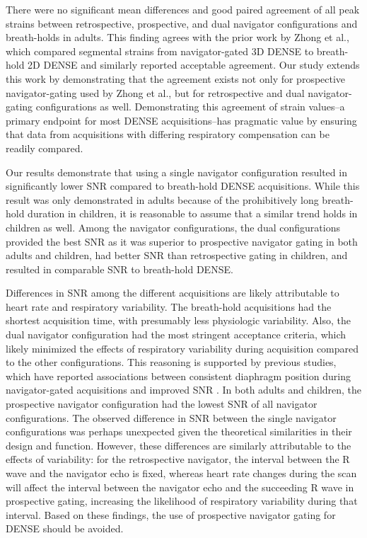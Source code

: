 	There were no significant mean differences and good paired agreement of all peak strains between retrospective, prospective, and dual navigator configurations and breath-holds in adults. This finding agrees with the prior work by Zhong et al., which compared segmental strains from navigator-gated 3D DENSE to breath-hold 2D DENSE \cite{Zhong2010a} and similarly reported acceptable agreement. Our study extends this work by demonstrating that the agreement exists not only for prospective navigator-gating used by Zhong et al., but for retrospective and dual navigator-gating configurations as well. Demonstrating this agreement of strain values--a primary endpoint for most DENSE acquisitions--has pragmatic value by ensuring that data from acquisitions with differing respiratory compensation can be readily compared.
	
	Our results demonstrate that using a single navigator configuration resulted in significantly lower SNR compared to breath-hold DENSE acquisitions. While this result was only demonstrated in adults because of the prohibitively long breath-hold duration in children, it is reasonable to assume that a similar trend holds in children as well. Among the navigator configurations, the dual configurations provided the best SNR as it was superior to prospective navigator gating in both adults and children, had better SNR than retrospective gating in children, and resulted in comparable SNR to breath-hold DENSE.
	
	Differences in SNR among the different acquisitions are likely attributable to heart rate and respiratory variability. The breath-hold acquisitions had the shortest acquisition time, with presumably less physiologic variability. Also, the dual navigator configuration had the most stringent acceptance criteria, which likely minimized the effects of respiratory variability during acquisition compared to the other configurations. This reasoning is supported by previous studies, which have reported associations between consistent diaphragm position during navigator-gated acquisitions and improved SNR \cite{Feuerlein2009,Jhooti2011}. In both adults and children, the prospective navigator configuration had the lowest SNR of all navigator configurations. The observed difference in SNR between the single navigator configurations was perhaps unexpected given the theoretical similarities in their design and function. However, these differences are similarly attributable to the effects of variability: for the retrospective navigator, the interval between the R wave and the navigator echo is fixed, whereas heart rate changes during the scan will affect the interval between the navigator echo and the succeeding R wave in prospective gating, increasing the likelihood of respiratory variability during that interval. Based on these findings, the use of prospective navigator gating for DENSE should be avoided.
	
